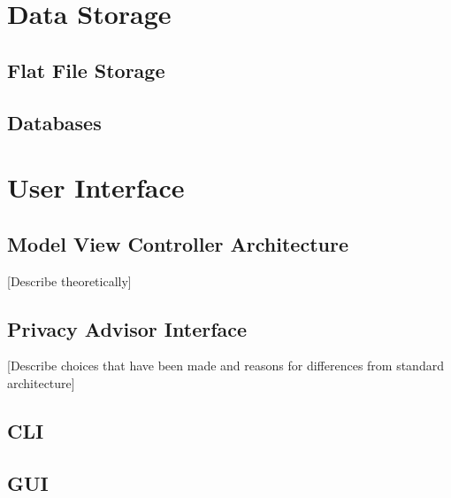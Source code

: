\section{Data Storage}

\subsection{Flat File Storage}

\subsection{Databases}

\section{User Interface}

\subsection{Model View Controller Architecture}
[Describe theoretically]

\subsection{Privacy Advisor Interface}
[Describe choices that have been made and reasons for differences from standard architecture]

\subsection{CLI}

\subsection{GUI}


